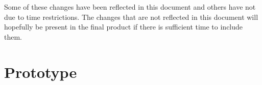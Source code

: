 \documentclass[
10pt, %
a4paper, %
oneside, %
headinclude,footinclude, %
BCOR5mm, %
]{scrartcl}
\begin{document}
Some of these changes have been reflected in this document and others have not due to time restrictions. The changes that are not reflected in this document will hopefully be present in the final product if there is sufficient time to include them.



\section{Prototype} %
\label{sec:prototype}




\newpage



% 



\end{document}
